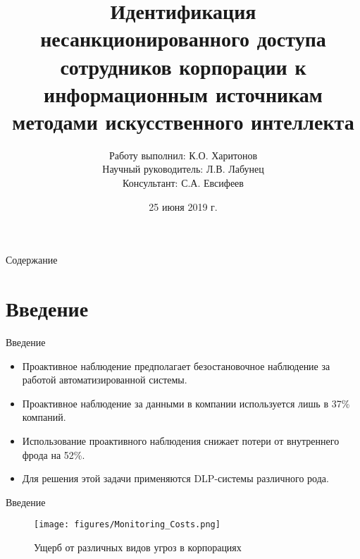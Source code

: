 \documentclass{beamer}
\title
{Идентификация несанкционированного доступа сотрудников корпорации к информационным источникам методами искусственного интеллекта}
\author[Харитонов К.О.] %
{
    Работу выполнил: К.О. Харитонов \inst{1}\\
    \small Научный руководитель: Л.В. Лабунец\inst{1}\\
    \small Консультант: С.А. Евсифеев\inst{2}
}
\institute[MSTU, MSU] %
{
  \inst{1}
  Системы обработки информации и управления, МГТУ им. Баумана
  \and
  \inst{2}
  Факультет вычислительной математики и кибернетики, МГУ
}
\date{25 июня 2019 г.}
\begin{document}
\maketitle

\begin{frame}{Содержание}
    \tableofcontents
\end{frame}

\section{Введение}
\begin{frame}{Введение}
    \begin{itemize}
        \item Проактивное наблюдение предполагает безостановочное наблюдение за работой автоматизированной системы.
        \item Проактивное наблюдение за данными в компании используется лишь в 37\% компаний.
        \item Использование проактивного наблюдения снижает потери от внутреннего фрода на 52\%.
        \item Для решения этой задачи применяются DLP-системы различного рода.
    \end{itemize}
\end{frame}

\begin{frame}{Введение}
    \begin{figure}
        \centering
        \texttt{[image: figures/Monitoring\_Costs.png]}
        \caption{Ущерб от различных видов угроз в корпорациях}
    \end{figure}
\end{frame}
\end{document}
